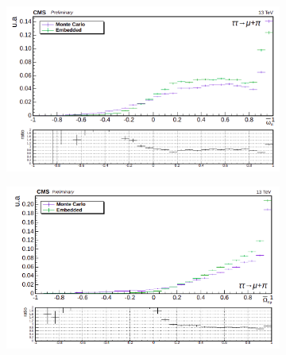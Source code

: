 \begin{figure}
    \begin{subfigure}[b]{0.5\linewidth}
    \centering
    \includegraphics[width=\linewidth]{Chapitre6/Images/OptVar/omegabar_pi_pimu.png} 
    \caption*{} 
    \vspace{10mm}
  \end{subfigure}%
  \begin{subfigure}[b]{0.5\linewidth}
    \centering
    \includegraphics[width=\linewidth]{Chapitre6/Images/OptVar/Omegabar_pimu.png} 
    \caption*{} 
    \vspace{10mm}
  \end{subfigure}


\end{figure}
